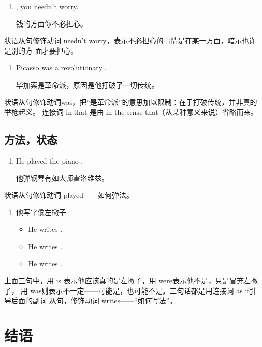 \begin{enumerate}
\item {} , you needn't
  worry.

  钱的方面你不必担心。
\end{enumerate}
状语从句修饰动词 needn't worry，表示不必担心的事情是在某一方面，暗示也许是别的方
面才要担心。

\begin{enumerate}[resume]
\item Picasso was a revolutionary  .

  毕加索是革命派，原因是他打破了一切传统。
\end{enumerate}
状语从句修饰动词was，把“是革命派”的意思加以限制：在于打破传统，并非真的举枪起义。
连接词 in that 是由 in the sense that（从某种意义来说）省略而来。

\subsection{方法，状态}

\begin{enumerate}
\item He played the piano  .

  他弹钢琴有如大师霍洛维兹。
\end{enumerate}
状语从句修饰动词 played——如何弹法。

\begin{enumerate}[resume]
\item 他写字像左撇子
  \begin{itemize}
  \item He writes   .
  \item He writes   .
  \item He writes   .
  \end{itemize}
\end{enumerate}

上面三句中，用 is 表示他应该真的是左撇子，用 were表示他不是，只是冒充左撇子，
用 was则表示不一定——可能是，也可能不是。三句话都是用连接词 as if引导后面的副词
从句，修饰动词 writes——“如何写法”。

\section{结语}

